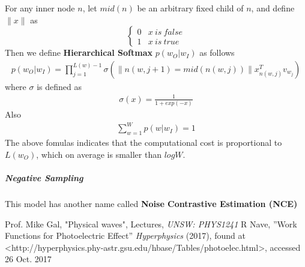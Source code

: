 \documentclass[paper=a4, fontsize=12pt]{scrartcl}
\begin{document}
For any inner node $n$, let $mid(n)$ be an arbitrary fixed child of $n$, and define $\| x \|$ as
\[ \begin{cases} 
      0 & x \ is \  false\\
      1 & x \ is \ true
   \end{cases}
\]
Then we define \textbf{Hierarchical Softmax} $p(w_O | w_I)$ as follows
\begin{align*}
p(w_O | w_I) = \prod^{L(w)-1}_{j = 1} \sigma ( \| n(w, j + 1) = mid(n(w, j))\| x_{n(w, j)}^{T} v_{w_j} )
\end{align*}
where $\sigma$ is defined as
\begin{align*}
\sigma(x) = \frac{1}{1 + exp(-x)}
\end{align*}
Also
\begin{align*}
\sum^W_{w = 1} p(w | w_I) = 1
\end{align*}
The above fomulas indicates that the computational cost is proportional to $L(w_O)$, which on average is smaller than $logW$.
\subparagraph{Negative Sampling} This model has another name called \textbf{Noise Contrastive Estimation (NCE)}




\clearpage

\begin{thebibliography}{99}
 Prof. Mike Gal, "Physical waves", Lectures, {\em UNSW: PHYS1241}
 R Nave, ''Work Functions for Photoelectric Effect'' {\em Hyperphysics} (2017), found at <http://hyperphysics.phy-astr.gsu.edu/hbase/Tables/photoelec.html>, accessed 26 Oct. 2017

\end{thebibliography}
\end{document}
